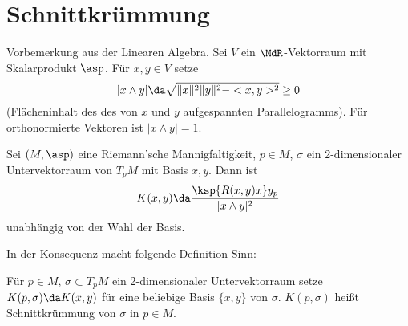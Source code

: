 \documentclass[a4paper,twoside,DIV15,BCOR12mm]{scrbook}
\begin{document}
\section{Schnittkrümmung}

Vorbemerkung aus der Linearen Algebra. Sei $V$ ein $\MdR$-Vektorraum mit Skalarprodukt $\asp$. Für $x,y\in V$ setze 
\[
| x \wedge y| \da \sqrt{\|x\|^2 \|y\|^2 - <x,y>^2} \ge 0
\]
(Flächeninhalt des des von $x$ und $y$ aufgespannten Parallelogramms). Für orthonormierte Vektoren ist $|x\wedge y| = 1$.

\begin{lemma}
Sei $(M,\asp)$ eine Riemann’sche Mannigfaltigkeit, $p\in M$, $\sigma$ ein 2-dimensionaler Untervektorraum von $T_pM$ mit Basis $x,y$. Dann ist 
\[
K(x,y) \da \frac{\ksp {R(x,y)x} y_p}{|x\wedge y|^2}
\] unabhängig von der Wahl der Basis.
\end{lemma}

In der Konsequenz macht folgende Definition Sinn:
\begin{definition}
Für $p\in M$, $\sigma \subset T_pM$ ein 2-dimensionaler Untervektorraum setze $K(p,\sigma) \da K(x,y)$ für eine beliebige Basis $\{x,y\}$ von $\sigma$. $K(p,\sigma)$ heißt Schnittkrümmung von $\sigma$ in $p\in M$.
\end{definition}
\end{document}
